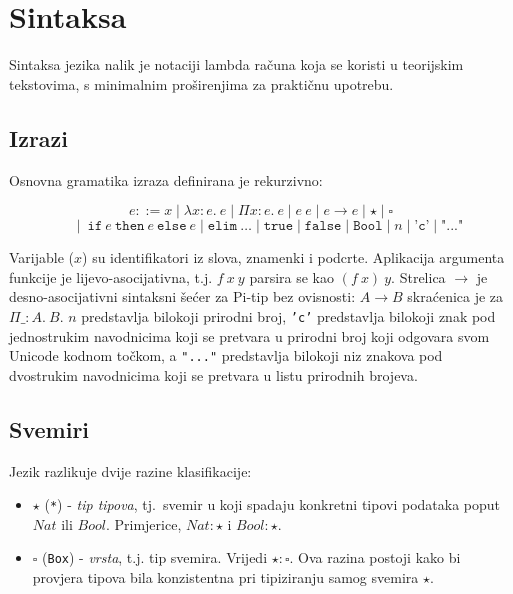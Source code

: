 \documentclass[diplomskirad,upload]{fer}
\begin{document}
\section{Sintaksa}

Sintaksa jezika nalik je notaciji lambda računa koja se koristi u teorijskim
tekstovima, s minimalnim proširenjima za praktičnu upotrebu.

\subsection{Izrazi}

Osnovna gramatika izraza definirana je rekurzivno:

\[
e ::= x \mid \lambda x : e.\ e \mid \Pi x : e.\ e \mid e\ e \mid e \to e
\mid \star \mid \square
\]
\[
\quad\mid\ \texttt{if}\ e\ \texttt{then}\ e\ \texttt{else}\ e
\mid \texttt{elim}\ \ldots
\mid \texttt{true} \mid \texttt{false} \mid \texttt{Bool}
\mid n \mid \texttt{'c'} \mid \texttt{"..."}
\]

Varijable (\(x\)) su identifikatori iz slova, znamenki i podcrte. Aplikacija argumenta funkcije je
lijevo-asocijativna, t.j. \(f\ x\ y\) parsira se kao \((f\ x)\ y\). Strelica
\(\to\) je desno-asocijativni sintaksni šećer  za
Pi-tip bez ovisnosti: \(A \to B\) skraćenica je za \(\Pi \_ : A.\ B\).
\(n\) predstavlja bilokoji prirodni broj, \texttt{'c'} predstavlja bilokoji znak
pod jednostrukim navodnicima koji se pretvara u prirodni broj koji odgovara svom
Unicode kodnom točkom, a \texttt{"..."} predstavlja bilokoji niz znakova pod
dvostrukim navodnicima koji se pretvara u listu prirodnih brojeva.

\subsection{Svemiri}

Jezik razlikuje dvije razine klasifikacije:

\begin{itemize}
    \item \(\star\) (\texttt{*}) - \emph{tip tipova}, tj.\ svemir u koji
    spadaju konkretni tipovi podataka poput \(Nat\) ili \(Bool\). Primjerice,
    \(Nat : \star\) i \(Bool : \star\).
    \item \(\square\) (\texttt{Box}) - \emph{vrsta}, t.j. tip svemira.
    Vrijedi \(\star : \square\). Ova razina postoji kako bi provjera tipova
    bila konzistentna pri tipiziranju samog svemira \(\star\).
\end{itemize}
\end{document}
